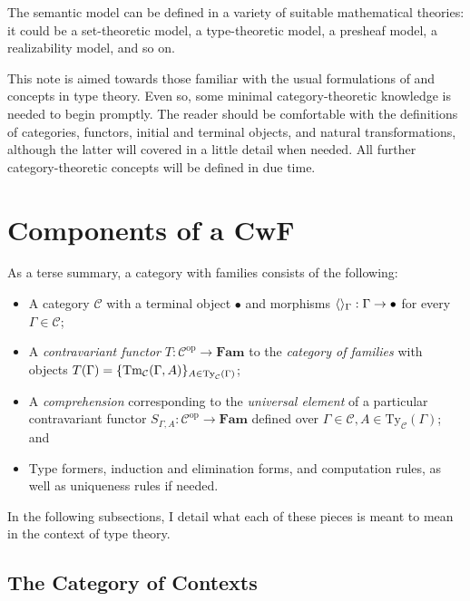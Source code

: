 \documentclass{article}
\renewcommand{\_}{\textrm{\textscale{.5}{\textunderscore}}}
\DeclarePairedDelimiter{\ctxt}{\langle}{\rangle}
\DeclarePairedDelimiter{\set}{\{}{\}}
\newcommand{\op}[1]{#1^{\mathrm{op}}}
\newcommand{\cat}[1]{\textbf{#1}}
\newcommand{\Tm}{\mathrm{Tm}}
\newcommand{\Ty}{\mathrm{Ty}}
\theoremstyle{definition}
\theoremstyle{plain}
\begin{document}
The semantic model can be defined in a variety of suitable mathematical theories: it could be a set-theoretic model, a type-theoretic model, a presheaf model, a realizability model, and so on.

This note is aimed towards those familiar with the usual formulations of and concepts in type theory.
Even so, some minimal category-theoretic knowledge is needed to begin promptly.
The reader should be comfortable with the definitions of categories, functors, initial and terminal objects, and natural transformations,
although the latter will covered in a little detail when needed.
All further category-theoretic concepts will be defined in due time.

\section{Components of a CwF}

As a terse summary, a category with families consists of the following:

\begin{itemize}
    \item A category $\mathcal{C}$ with a terminal object $\bullet$ and morphisms $\ctxt{}_\Gamma : \Gamma \to \bullet$
    for every $\Gamma \in \mathcal{C}$;
    \item A \emph{contravariant functor} $T : \op{\mathcal{C}} \to \cat{Fam}$ to the \emph{category of families}
    with objects $T(\Gamma) = \set{\Tm_{\mathcal{C}}(\Gamma, A)}_{A \in \Ty_{\mathcal{C}}(\Gamma)}$;
    \item A \emph{comprehension} corresponding to the \emph{universal element} of a particular contravariant functor $S_{\Gamma, A} : \op{\mathcal{C}} \to \cat{Fam}$ defined over $\Gamma \in \mathcal{C}, A \in \Ty_{\mathcal{C}}(\Gamma)$; and
    \item Type formers, induction and elimination forms, and computation rules, as well as uniqueness rules if needed.
\end{itemize}

In the following subsections, I detail what each of these pieces is meant to mean in the context of type theory.

\subsection{The Category of Contexts}
\end{document}
